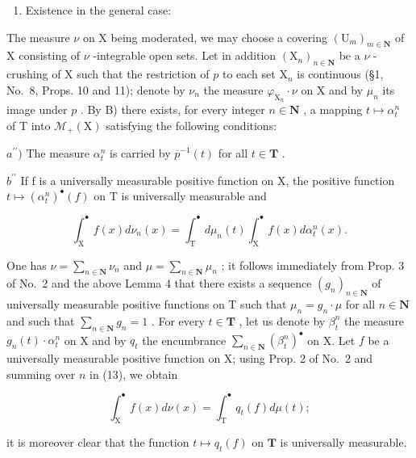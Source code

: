 \begin{enumerate}
\def\labelenumi{\Alph{enumi})}
\setcounter{enumi}{2}
\tightlist
\item
  Existence in the general case:
\end{enumerate}

The measure \(\nu\) on X being moderated, we may choose a covering \((\mathrm{U}_m)_{m\in \mathbf{N}}\) of X consisting of \(\nu\) -integrable open sets. Let in addition \((\mathrm{X}_n)_{n\in \mathbf{N}}\) be a \(\nu\) -crushing of X such that the restriction of \(p\) to each set \(\mathrm{X}_n\) is continuous (§1, No.~8, Props. 10 and 11); denote by \(\nu_n\) the measure \(\varphi_{\mathrm{X}_n}\cdot \nu\) on X and by \(\mu_n\) its image under \(p\) . By B) there exists, for every integer \(n\in \mathbf{N}\) , a mapping \(t\mapsto \alpha_t^n\) of T into \(\mathcal{M}_{+}(\mathrm{X})\) satisfying the following conditions:

\(a^{\prime \prime})\) The measure \(\alpha_{t}^{n}\) is carried by \(\overline{p}^{-1}(t)\) for all \(t\in \mathbf{T}\) .

\(b^{\prime\prime}\) If f is a universally measurable positive function on X, the positive function \(t \mapsto (\alpha_{t}^{n})^{\bullet}(f)\) on T is universally measurable and

\[
\int_ {\mathrm{X}} ^ {\bullet} f (x) d \nu_ {n} (x) = \int_ {\mathrm{T}} ^ {\bullet} d \mu_ {n} (t) \int_ {\mathrm{X}} ^ {\bullet} f (x) d \alpha_ {t} ^ {n} (x).\tag{13}
\]

One has \(\nu = \sum_{n\in \mathbf{N}}\nu_n\) and \(\mu = \sum_{n\in \mathbf{N}}\mu_n\) ; it follows immediately from Prop. 3 of No.~2 and the above Lemma 4 that there exists a sequence \((g_n)_{n\in \mathbf{N}}\) of universally measurable positive functions on T such that \(\mu_{n} = g_{n}\cdot \mu\) for all \(n\in \mathbf{N}\) and such that \(\sum_{n\in \mathbf{N}}g_n = 1\) . For every \(t\in \mathbf{T}\) , let us denote by \(\beta_t^n\) the measure \(g_{n}(t)\cdot \alpha_{t}^{n}\) on X and by \(q_{t}\) the encumbrance \(\sum_{n\in \mathbf{N}}(\beta_t^n)^{\bullet}\) on X. Let \(f\) be a universally measurable positive function on X; using Prop. 2 of No.~2 and summing over \(n\) in (13), we obtain

\[
\int_ {\mathrm{X}} ^ {\bullet} f (x) d \nu (x) = \int_ {\mathrm{T}} ^ {\bullet} q _ {t} (f) d \mu (t);\tag{14}
\]

it is moreover clear that the function \(t \mapsto q_t(f)\) on \(\mathbf{T}\) is universally measurable.

